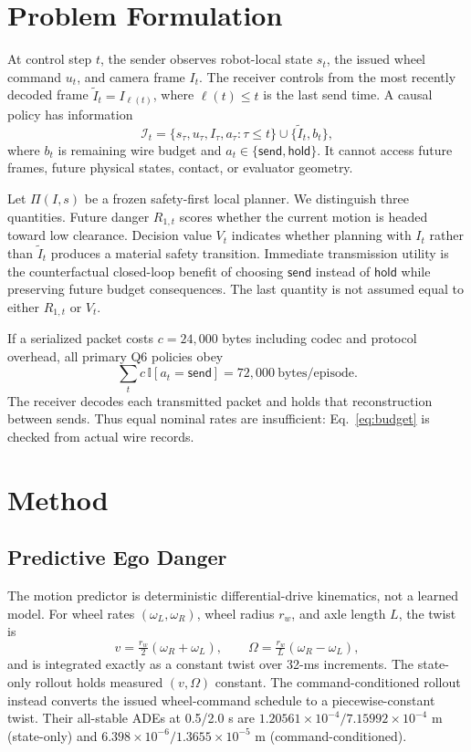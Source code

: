 \documentclass[letterpaper,10pt,conference]{ieeeconf}
\newcommand{\send}{\mathsf{send}}
\newcommand{\hold}{\mathsf{hold}}
\begin{document}
\section{Problem Formulation}

At control step $t$, the sender observes robot-local state $s_t$, the issued
wheel command $u_t$, and camera frame $I_t$. The receiver controls from the most
recently decoded frame $\tilde I_t=I_{\ell(t)}$, where $\ell(t)\leq t$ is the
last send time. A causal policy has information
\begin{equation}
\mathcal I_t=\{s_\tau,u_\tau,I_\tau,a_\tau:\tau\leq t\}
\cup\{\tilde I_t,b_t\},
\end{equation}
where $b_t$ is remaining wire budget and
$a_t\in\{\send,\hold\}$. It cannot access future frames, future physical
states, contact, or evaluator geometry.

Let $\Pi(I,s)$ be a frozen safety-first local planner. We distinguish three
quantities. Future danger $R_{1,t}$ scores whether the current motion is headed
toward low clearance. Decision value $V_t$ indicates whether planning with
$I_t$ rather than $\tilde I_t$ produces a material safety transition. Immediate
transmission utility is the counterfactual closed-loop benefit of choosing
$\send$ instead of $\hold$ while preserving future budget consequences. The
last quantity is not assumed equal to either $R_{1,t}$ or $V_t$.

If a serialized packet costs $c=24{,}000$ bytes including codec and protocol
overhead, all primary Q6 policies obey
\begin{equation}
\sum_t c\,\mathbb I[a_t=\send]=72{,}000~\text{bytes/episode}.
\label{eq:budget}
\end{equation}
The receiver decodes each transmitted packet and holds that reconstruction
between sends. Thus equal nominal rates are insufficient: Eq.~\eqref{eq:budget}
is checked from actual wire records.

\section{Method}

\subsection{Predictive Ego Danger}
The motion predictor is deterministic differential-drive kinematics, not a
learned model. For wheel rates $(\omega_L,\omega_R)$, wheel radius $r_w$, and
axle length $L$, the twist is
\begin{equation}
v=\tfrac{r_w}{2}(\omega_R+\omega_L),\qquad
\Omega=\tfrac{r_w}{L}(\omega_R-\omega_L),
\end{equation}
and is integrated exactly as a constant twist over 32-ms increments. The
state-only rollout holds measured $(v,\Omega)$ constant. The
command-conditioned rollout instead converts the issued wheel-command schedule
to a piecewise-constant twist. Their all-stable ADEs at 0.5/2.0 s are
$1.20561\!\times\!10^{-4}/7.15992\!\times\!10^{-4}$ m (state-only) and
$6.398\!\times\!10^{-6}/1.3655\!\times\!10^{-5}$ m
(command-conditioned).
\end{document}

